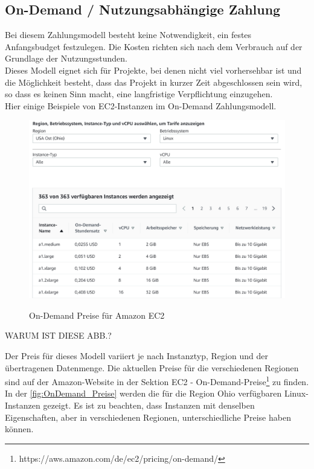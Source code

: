 \subsection{On-Demand / Nutzungsabhängige Zahlung}
Bei diesem Zahlungsmodell besteht keine Notwendigkeit, ein festes Anfangsbudget festzulegen. Die Kosten richten sich nach dem Verbrauch auf der Grundlage der Nutzungsstunden.
\\
Dieses Modell eignet sich für Projekte, bei denen nicht viel vorhersehbar ist und die Möglichkeit besteht, dass das Projekt in kurzer Zeit abgeschlossen sein wird, so dass es keinen Sinn macht, eine langfristige Verpflichtung einzugehen.
\\
Hier einige Beispiele von EC2-Instanzen im On-Demand Zahlungsmodell.
\begin{figure}
    \centering
    \includegraphics[scale=0.4]{sources/On-Demand-Pläne für Amazon EC2}\label{fig:OnDemand_Preise}\\
    \caption[On-Demand Preise für Amazon EC2]{}
    \label{fig:OnDemand_Preise}  On-Demand Preise für Amazon EC2 {\cite{AMZ02}}
  \end{figure}

  WARUM IST DIESE ABB.?

Der Preis für dieses Modell variiert je nach Instanztyp, Region und der übertragenen Datenmenge. 
Die aktuellen Preise für die verschiedenen Regionen sind auf der Amazon-Website in der Sektion EC2 - On-Demand-Preise\footnote{https://aws.amazon.com/de/ec2/pricing/on-demand/} zu finden.
In der \autoref{fig:OnDemand_Preise} werden die für die Region Ohio verfügbaren Linux-Instanzen gezeigt. Es ist zu beachten, dass Instanzen mit denselben Eigenschaften, aber in verschiedenen Regionen, unterschiedliche Preise haben können.

